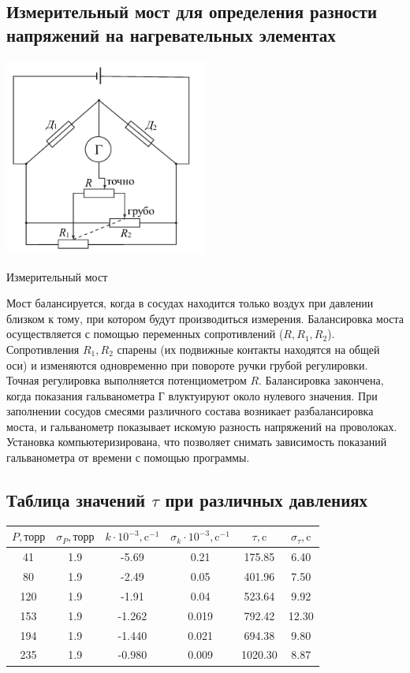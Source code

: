 \subsection{Измерительный мост для определения разности напряжений на нагревательных элементах}
\begin{center}
    \includegraphics[width=0.5\textwidth]{img/most.png}
    
Измерительный мост
\end{center}
Мост балансируется, когда в сосудах находится только воздух при давлении близком к тому, при котором будут производиться измерения. Балансировка моста осуществляется с помощью переменных сопротивлений ($R, R_1, R_2$). Сопротивления $R_1, R_2$ спарены (их подвижные контакты находятся на общей оси) и изменяются одновременно при повороте ручки грубой регулировки. Точная регулировка выполняется потенциометром $R$. Балансировка закончена, когда показания гальванометра $\text{Г}$ влуктуируют около нулевого значения. При заполнении сосудов смесями различного состава возникает разбалансировка моста, и гальванометр показывает искомую разность напряжений на проволоках. Установка компьютеризирована, что позволяет снимать зависимость показаний гальванометра от времени с помощью программы.

\subsection{Таблица значений $\tau$ при различных давлениях}
\begin{tabular}{|c|c|c|c|c|c|}
    \hline
    $P, \text{торр}$ &  $\sigma_P, \text{торр}$ & $k\cdot 10^{-3}, \text{c}^{-1}$ & $\sigma_k\cdot 10^{-3}, \text{c}^{-1}$ & $\tau, \text{c}$ & $\sigma_\tau, \text{c}$ \\ \hline
    41  & 1.9 & -5.69  & 0.21  & 175.85  & 6.40 \\ \hline
    80  & 1.9 & -2.49  & 0.05  & 401.96  & 7.50 \\ \hline
    120 & 1.9 & -1.91  & 0.04  & 523.64  & 9.92 \\ \hline
    153 & 1.9 & -1.262 & 0.019 & 792.42  & 12.30 \\ \hline
    194 & 1.9 & -1.440 & 0.021 & 694.38  & 9.80 \\ \hline
    235 & 1.9 & -0.980 & 0.009 & 1020.30 & 8.87 \\ \hline
\end{tabular}

